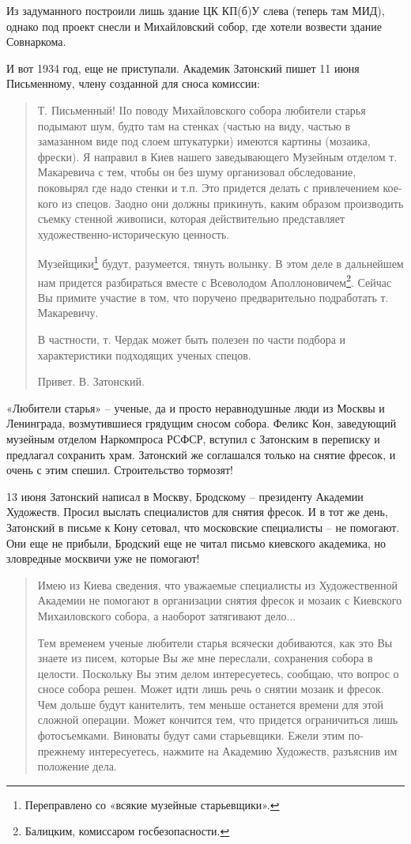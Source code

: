 Из задуманного построили лишь здание ЦК КП(б)У слева (теперь там МИД), однако под проект снесли и Михайловский собор, где хотели возвести здание Совнаркома.

И вот 1934 год, еще не приступали. Академик Затонский пишет 11 июня Письменному, члену созданной для сноса комиссии\cite{mikorsky01}:

\begin{quotation}
Т. Письменный! ІІо поводу Михайловского собора любители старья подымают шум, будто там на стенках (частью на виду, частью в замазанном виде под слоем штукатурки) имеются картины (мозаика, фрески). Я направил в Киев нашего заведывающего Музейным отделом т. Макаревича с тем, чтобы он без шуму организовал обследование, поковырял где надо стенки и т.п. Это придется делать с привлечением кое-кого из спецов. Заодно они должны прикинуть, каким образом производить съемку стенной живописи, которая действительно представляет художественно-историческую ценность. 

Музейщики\footnote{Переправлено со «всякие музейные старьевщики».} будут, разумеется, тянуть волынку. В этом деле в дальнейшем нам придется разбираться вместе с Всеволодом Аполлоновичем\footnote{Балицким, комиссаром госбезопасности.}. Сейчас Вы примите участие в том, что поручено предварительно подработать т. Макаревичу.

В частности, т. Чердак может быть полезен по части подбора и характеристики подходящих ученых спецов.

Привет. В. Затонский.
\end{quotation}
 
«Любители старья» – ученые, да и просто неравнодушные люди из Москвы и Ленинграда, возмутившиеся грядущим сносом собора. Феликс Кон, заведующий музейным отделом Наркомпроса РСФСР, вступил с Затонским в переписку и предлагал сохранить храм. Затонский же соглашался только на снятие фресок, и очень с этим спешил. Строительство тормозят!

13 июня Затонский написал в Москву, Бродскому – президенту Академии Художеств. Просил выслать специалистов для снятия фресок. И в тот же день, Затонский в письме к Кону сетовал, что московские специалисты – не помогают. Они еще не прибыли, Бродский еще не читал письмо киевского академика, но зловредные москвичи уже не помогают!

\begin{quotation}
Имею из Киева сведения, что уважаемые специалисты из Художественной Академии не помогают в организации снятия фресок и мозаик с Киевского Михаиловского собора, а наоборот затягивают дело...

Тем временем ученые любители старья всячески добиваются, как это Вы знаете из писем, которые Вы же мне переслали, сохранения собора в целости. Поскольку Вы этим делом интересуетесь, сообщаю, что вопрос о сносе собора решен. Может идти лишь речь о снятии мозаик и фресок. Чем дольше будут канителить, тем меньше останется времени для этой сложной операции. Может кончится тем, что придется ограничиться лишь фотосъемками. Виноваты будут сами старьевщики. Ежели этим по-прежнему интересуетесь, нажмите на Академию Художеств, разъяснив им положение дела.
\end{quotation}

